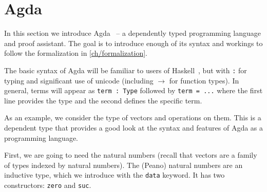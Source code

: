 \section{Agda}
In this section we introduce Agda~\cite{Agda} -- a dependently typed programming language
and proof assistant.
The goal is to introduce enough of its syntax and workings to follow the formalization in \autoref{ch/formalization}.

The basic syntax of Agda will be familiar to users of Haskell~\cite{haskell2010},
but with \texttt{:} for typing and significant use of unicode (including $\rightarrow$
for function types). In general, terms will appear as \texttt{term : Type} followed by
\texttt{term = ...} where the first line provides the type and the second defines the
specific term.

As an example, we consider the type of vectors and operations on them.
This is a dependent type that provides a good look at the syntax and features of
Agda as a programming language.

First, we are going to need the natural numbers (recall that vectors are a family of types indexed by natural numbers).
The (Peano) natural numbers are an inductive type, which we introduce with the \texttt{data} keyword.
It has two constructors: \texttt{zero} and \texttt{suc}.
\begin{code}%
\>[0]\AgdaSpace{}%
\AgdaSpace{}%
\AgdaSymbol{:}\AgdaSpace{}%
\AgdaSpace{}%
\<%
\\
\>[0][@{}l@{\AgdaIndent{0}}]%
\>[2]\AgdaSpace{}%
\AgdaSymbol{:}\AgdaSpace{}%
\<%
\\
%
\>[2]\AgdaSpace{}%
\AgdaSymbol{:}\AgdaSpace{}%
\AgdaSpace{}%
\AgdaSpace{}%
\<%
\end{code}
\begin{code}[hide]%
\>[0]\AgdaOperator{\AgdaFunction{\AgdaUnderscore{}+\AgdaUnderscore{}}}\AgdaSpace{}%
\AgdaSymbol{:}\AgdaSpace{}%
\AgdaSpace{}%
\AgdaSpace{}%
\AgdaSpace{}%
\AgdaSpace{}%
\<%
\\
\>[0]\AgdaSpace{}%
\AgdaOperator{\AgdaFunction{+}}\AgdaSpace{}%
\AgdaSpace{}%
\AgdaSymbol{=}\AgdaSpace{}%
\<%
\\
\>[0]\AgdaSpace{}%
\AgdaSpace{}%
\AgdaOperator{\AgdaFunction{+}}\AgdaSpace{}%
\AgdaSpace{}%
\AgdaSymbol{=}\AgdaSpace{}%
\AgdaSpace{}%
\AgdaSymbol{(}\AgdaSpace{}%
\AgdaOperator{\AgdaFunction{+}}\AgdaSpace{}%
\AgdaSymbol{)}\<%
\\
%
\\[\AgdaEmptyExtraSkip]%
\>[0]\AgdaSpace{}%
\AgdaSpace{}%
\<%
\end{code}

